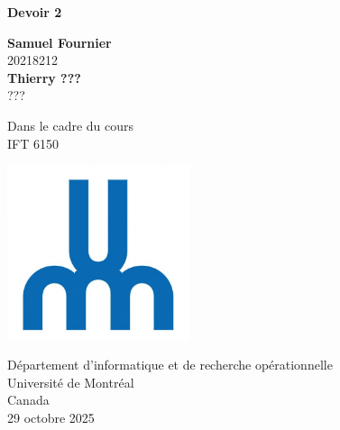 \documentclass{article}
\begin{document}
\begin{titlepage}
	\begin{center}
		\vspace*{1cm}

		\Huge
		\textbf{Devoir 2}

		\vspace{0.5cm}
		\LARGE

		\vspace{1.5cm}

        
		\textbf{Samuel Fournier}\\20218212 \\
		\vfill
		\textbf{Thierry ???}\\??? \\
		\vfill


		Dans le cadre du cours\\
		IFT 6150


		\vspace{0.8cm}

		\includegraphics[width=0.4\textwidth]{udem.jpg}

		\Large
		Département d'informatique et de recherche opérationnelle\\
		Université de Montréal\\
		Canada\\
		29 octobre 2025

	\end{center}
\end{titlepage}
\end{document}
